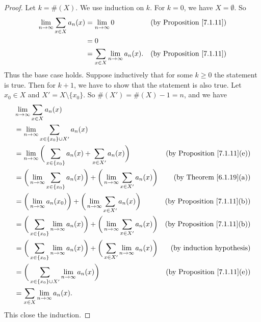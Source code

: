 \begin{proof}
    Let \(k = \#(X)\).
    We use induction on \(k\).
    For \(k = 0\), we have \(X = \emptyset\).
    So
    \begin{align*}
        \lim_{n \to \infty} \sum_{x \in X} a_n(x) & = \lim_{n \to \infty} 0                      & \text{(by Proposition \ref{7.1.11})} \\
                                                  & = 0                                                                                 \\
                                                  & = \sum_{x \in X} \lim_{n \to \infty} a_n(x). & \text{(by Proposition \ref{7.1.11})}
    \end{align*}
    Thus the base case holds.
    Suppose inductively that for some \(k \geq 0\) the statement is true.
    Then for \(k + 1\), we have to show that the statement is also true.
    Let \(x_0 \in X\) and \(X' = X \setminus \{x_0\}\).
    So \(\#(X') = \#(X) - 1 = n\), and we have
    \begin{align*}
         & \lim_{n \to \infty} \sum_{x \in X} a_n(x)                                                                                                                        \\
         & = \lim_{n \to \infty} \sum_{x \in \{x_0\} \cup X'} a_n(x)                                                                                                        \\
         & = \lim_{n \to \infty} \bigg(\sum_{x \in \{x_0\}} a_n(x) + \sum_{x \in X'} a_n(x)\bigg)                                 & \text{(by Proposition \ref{7.1.11}(e))} \\
         & = \bigg(\lim_{n \to \infty} \sum_{x \in \{x_0\}} a_n(x)\bigg) + \bigg(\lim_{n \to \infty} \sum_{x \in X'} a_n(x)\bigg) & \text{(by Theorem \ref{6.1.19}(a))}     \\
         & = \bigg(\lim_{n \to \infty} a_n(x_0)\bigg) + \bigg(\lim_{n \to \infty} \sum_{x \in X'} a_n(x)\bigg)                    & \text{(by Proposition \ref{7.1.11}(b))} \\
         & = \bigg(\sum_{x \in \{x_0\}} \lim_{n \to \infty} a_n(x)\bigg) + \bigg(\lim_{n \to \infty} \sum_{x \in X'} a_n(x)\bigg) & \text{(by Proposition \ref{7.1.11}(b))} \\
         & = \bigg(\sum_{x \in \{x_0\}} \lim_{n \to \infty} a_n(x)\bigg) + \bigg(\sum_{x \in X'} \lim_{n \to \infty} a_n(x)\bigg) & \text{(by induction hypothesis)}        \\
         & = \bigg(\sum_{x \in \{x_0\} \cup X'} \lim_{n \to \infty} a_n(x)\bigg)                                                  & \text{(by Proposition \ref{7.1.11}(e))} \\
         & = \sum_{x \in X} \lim_{n \to \infty} a_n(x).
    \end{align*}
    This close the induction.
\end{proof}